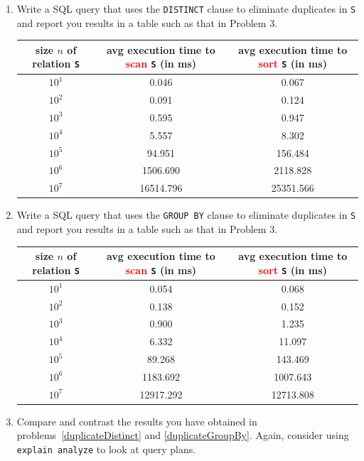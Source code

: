 \documentclass[10pt]{article}
\newcommand{\blue}[1]{{\color{blue}#1}}
\begin{document}
\begin{enumerate}
\item \label{duplicateDistinct} 
Write a SQL query that uses the \blue{\tt DISTINCT} clause to eliminate duplicates in {\tt S} and 
report you results in a table such as that in Problem 3.

\begin{center}
\begin{tabular}{c|c|c}
size $n$ of relation {\tt S} & avg execution time to \textcolor{red}{scan} {\tt S} (in ms) &avg execution time to \textcolor{red}{sort} {\tt S} (in ms) \\ \hline
$10^1$ & 0.046 & 0.067 \\
$10^2$ & 0.091 & 0.124 \\
$10^3$ & 0.595 & 0.947 \\
$10^4$ & 5.557 & 8.302 \\
$10^5$ & 94.951 & 156.484 \\
$10^6$ & 1506.690 & 2118.828 \\
$10^7$ & 16514.796 & 25351.566 \\
\end{tabular}
\end{center}

\item \label{duplicateGroupBy}  Write a SQL query that uses the \blue{\tt GROUP BY} clause to eliminate duplicates in {\tt S} and 
report you results in a table such as that in Problem 3.

\begin{center}
\begin{tabular}{c|c|c}
size $n$ of relation {\tt S} & avg execution time to \textcolor{red}{scan} {\tt S} (in ms) &avg execution time to \textcolor{red}{sort} {\tt S} (in ms) \\ \hline
$10^1$ & 0.054 & 0.068 \\
$10^2$ & 0.138 & 0.152 \\
$10^3$ & 0.900 & 1.235 \\
$10^4$ & 6.332 & 11.097 \\
$10^5$ & 89.268 & 143.469 \\
$10^6$ & 1183.692 & 1007.643 \\
$10^7$ & 12917.292 & 12713.808 \\
\end{tabular}
\end{center}

\item Compare and contrast the results you have obtained in problems~\ref{duplicateDistinct} and \ref{duplicateGroupBy}.
Again, consider using \blue{\tt explain analyze} to look at query plans.


\end{enumerate}
\end{document}

